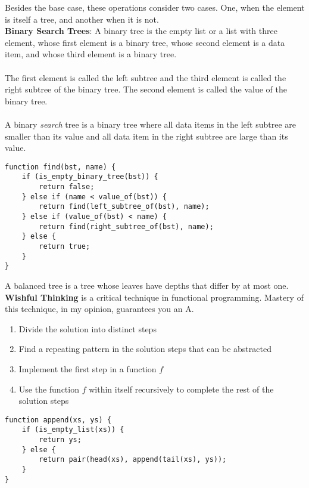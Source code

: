 \documentclass[a4paper]{article} \usepackage[backend=biber, style=numeric, sorting=none]{biblatex}
\begin{document}
\begin{multicols*}{4}
Besides the base case, these operations consider two cases. One, when the element is itself a tree, and another when it is not. \\

{\small\textbf{Binary Search Trees}}: A binary tree is the empty list or a list with three element, whose first element is a binary tree, whose second element is a data item, and whose third element is a binary tree.
\\ \\
The first element is called the left subtree and the third element is called the right subtree of the binary tree. The second element is called the value of the binary tree.
\\ \\
A binary \textit{search} tree is a binary tree where all data items in the left subtree are smaller than its value and all data item in the right subtree are large than its value.

\begin{verbatim}
function find(bst, name) {
    if (is_empty_binary_tree(bst)) {
        return false;
    } else if (name < value_of(bst)) {
        return find(left_subtree_of(bst), name);
    } else if (value_of(bst) < name) {
        return find(right_subtree_of(bst), name);
    } else {
        return true;
    }
}
\end{verbatim}

A balanced tree is a tree whose leaves have depths that differ by at most one.\\

{\small\textbf{Wishful Thinking}} is a critical technique in functional programming. Mastery of this technique, in my opinion, guarantees you an A.

\begin{enumerate}
\itemsep -0.5em
\item Divide the solution into distinct steps
\item Find a repeating pattern in the solution steps that can be abstracted
\item Implement the first step in a function $f$
\item Use the function $f$ within itself recursively to complete the rest of the solution steps
\end{enumerate}

\begin{verbatim}
function append(xs, ys) {
    if (is_empty_list(xs)) {
        return ys;
    } else {
        return pair(head(xs), append(tail(xs), ys));
    }
}
\end{verbatim}


\end{multicols*}
\end{document}

